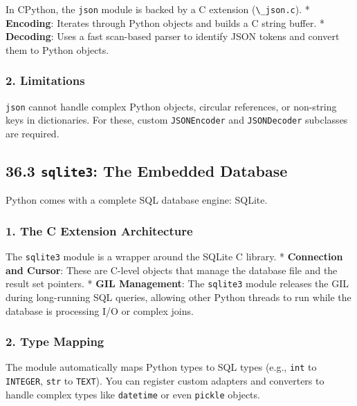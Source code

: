 In CPython, the \passthrough{\lstinline!json!} module is backed by a C
extension (\passthrough{\lstinline!\_json.c!}). * \textbf{Encoding}:
Iterates through Python objects and builds a C string buffer. *
\textbf{Decoding}: Uses a fast scan-based parser to identify JSON tokens
and convert them to Python objects.

\hypertarget{limitations}{%
\subsubsection{2. Limitations}\label{limitations}}

\passthrough{\lstinline!json!} cannot handle complex Python objects,
circular references, or non-string keys in dictionaries. For these,
custom \passthrough{\lstinline!JSONEncoder!} and
\passthrough{\lstinline!JSONDecoder!} subclasses are required.

\hypertarget{sqlite3-the-embedded-database}{%
\subsection{\texorpdfstring{36.3 \texttt{sqlite3}: The Embedded
Database}{36.3 sqlite3: The Embedded Database}}\label{sqlite3-the-embedded-database}}

Python comes with a complete SQL database engine: SQLite.

\hypertarget{the-c-extension-architecture}{%
\subsubsection{1. The C Extension
Architecture}\label{the-c-extension-architecture}}

The \passthrough{\lstinline!sqlite3!} module is a wrapper around the
SQLite C library. * \textbf{Connection and Cursor}: These are C-level
objects that manage the database file and the result set pointers. *
\textbf{GIL Management}: The \passthrough{\lstinline!sqlite3!} module
releases the GIL during long-running SQL queries, allowing other Python
threads to run while the database is processing I/O or complex joins.

\hypertarget{type-mapping}{%
\subsubsection{2. Type Mapping}\label{type-mapping}}

The module automatically maps Python types to SQL types (e.g.,
\passthrough{\lstinline!int!} to \passthrough{\lstinline!INTEGER!},
\passthrough{\lstinline!str!} to \passthrough{\lstinline!TEXT!}). You
can register custom adapters and converters to handle complex types like
\passthrough{\lstinline!datetime!} or even
\passthrough{\lstinline!pickle!} objects.

